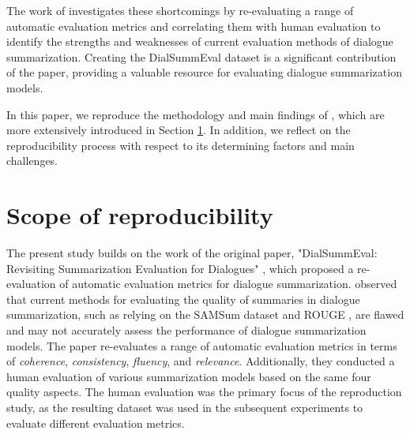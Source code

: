 The work of \citet{gao2022dialsummeval} investigates these shortcomings by re-evaluating a range of automatic evaluation metrics and correlating them with human evaluation to identify the strengths and weaknesses of current evaluation methods of dialogue summarization. Creating the DialSummEval dataset is a significant contribution of the paper, providing a valuable resource for evaluating dialogue summarization models.


In this paper, we reproduce the methodology and main findings of \citet{gao2022dialsummeval}, which are more extensively introduced in Section \ref{sec:claims}. In addition, we reflect on the reproducibility process with respect to its determining factors and main challenges. 



\section{Scope of reproducibility}
\label{sec:claims}

The present study builds on the work of the original paper, "DialSummEval: Revisiting Summarization Evaluation for Dialogues" \cite{gao2022dialsummeval}, which proposed a re-evaluation of automatic evaluation metrics for dialogue summarization. \citet{gao2022dialsummeval} observed that current methods for evaluating the quality of summaries in dialogue summarization, such as relying on the SAMSum dataset \cite{gliwa2019samsum} and ROUGE \cite{lin2004rouge}, are flawed and may not accurately assess the performance of dialogue summarization models. The paper re-evaluates a range of automatic evaluation metrics in terms of \textit{coherence}, \textit{consistency}, \textit{fluency}, and \textit{relevance}. Additionally, they conducted a human evaluation of various summarization models based on the same four quality aspects. The human evaluation was the primary focus of the reproduction study, as the resulting dataset was used in the subsequent experiments to evaluate different evaluation metrics.

